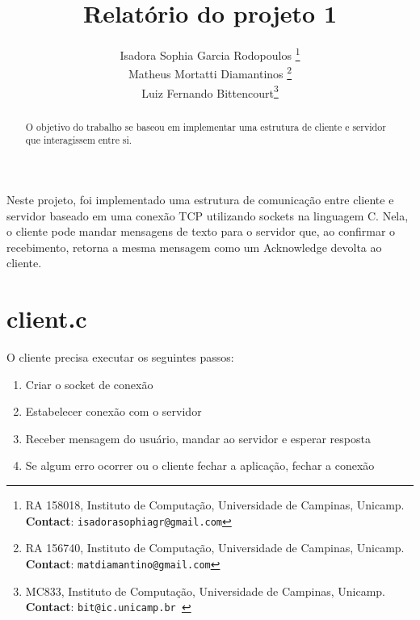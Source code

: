 \documentclass[10pt,twocolumn,letterpaper]{article}
\begin{document}
\title{Relatório do projeto 1}
\author{Isadora Sophia Garcia Rodopoulos \thanks{RA 158018, Instituto de Computação, Universidade de Campinas, Unicamp. \textbf{Contact}: \tt\small{isadorasophiagr@gmail.com}} \\
Matheus Mortatti Diamantinos \thanks{RA 156740, Instituto de Computação, Universidade de Campinas, Unicamp. \textbf{Contact}: \tt\small{matdiamantino@gmail.com}}\\
Luiz Fernando Bittencourt\thanks{MC833, Instituto de Computação, Universidade de Campinas, Unicamp. \textbf{Contact}: \tt\small{bit@ic.unicamp.br }}\\
}

\maketitle
\begin{abstract}
O objetivo do trabalho se baseou em implementar uma estrutura de cliente e servidor que interagissem entre si.
\end{abstract}

Neste projeto, foi implementado uma estrutura de comunicação entre cliente e servidor baseado em uma conexão TCP utilizando sockets na linguagem C. Nela, o cliente pode mandar mensagens de texto para o servidor que, ao confirmar o recebimento, retorna a mesma mensagem como um Acknowledge devolta ao cliente.

\section{client.c}
O cliente precisa executar os seguintes passos:

 \begin{enumerate}
   \item Criar o socket de conexão
   \item Estabelecer conexão com o servidor
   \item Receber mensagem do usuário, mandar ao servidor e esperar resposta
   \item Se algum erro ocorrer ou o cliente fechar a aplicação, fechar a conexão
 \end{enumerate}
\end{document}
